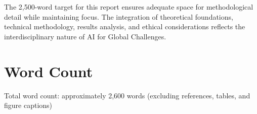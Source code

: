 \documentclass[12pt,a4paper]{article}
\begin{document}
The 2,500-word target for this report ensures adequate space for methodological detail while maintaining focus. The integration of theoretical foundations, technical methodology, results analysis, and ethical considerations reflects the interdisciplinary nature of AI for Global Challenges.

\section*{Word Count}

Total word count: approximately 2,600 words (excluding references, tables, and figure captions)
\end{document}

